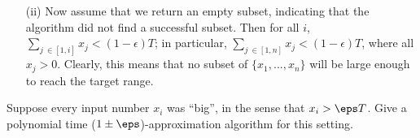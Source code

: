 \documentclass{article}
\begin{document}
\begin{solution}
\begin{subproof} [Correctness]
\begin{enumerate}
    We already know that \( \sum S \smallsetminus \{x_i\} < (1 - \epsilon) T \), otherwise, we would have already returned \( S = \{x_1, ..., x_{i-1}\} \) in a previous iteration. But \( x_i \leq \epsilon T \), so
    \begin{align*}
        \sum S = x_i + \sum S \smallsetminus \{x_i\} \ \leq \epsilon \ T + (1 - \epsilon) T = T \leq (1 + \epsilon) T
    \end{align*}
    \vspace{-1.3cc}
    \item [(ii)] Now assume that we return an empty subset, indicating that the algorithm did not find a successful subset. Then for all \( i \), \( \sum_{j\ \in [1, i]} x_j < (1 - \epsilon) T \); in particular, \( \sum_{j\ \in [1, n]} x_j < (1 - \epsilon) T \), where all \( x_j > 0 \). Clearly, this means that no subset of \( \{x_1, ..., x_n\} \) will be large enough to reach the target range.
\end{enumerate}

\end{subproof}

\end{solution}
\pagebreak

\begin{subexercise} \label{qs:big}
  Suppose every input number \( x_i \) was ``big'', in the sense that \( x_i > \eps T \). Give a polynomial time (\( 1\pm \eps \))-approximation algorithm for this setting.
\end{subexercise}
\end{document}
